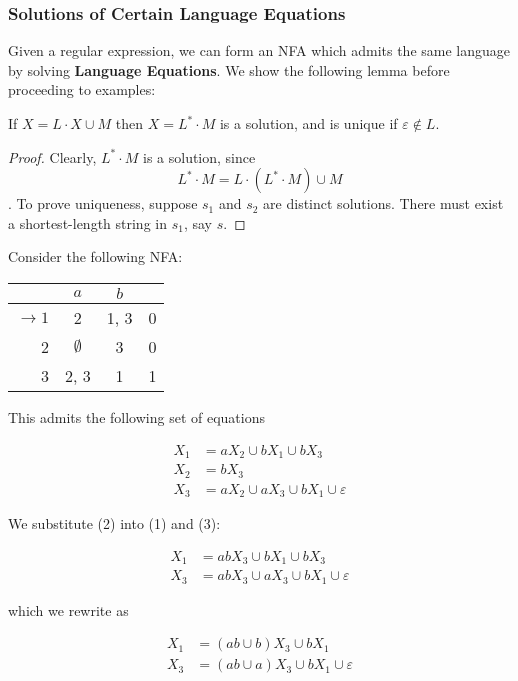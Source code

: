 \subsubsection{Solutions of Certain Language Equations}\label{subsubsec:solutions-of-certain-language-equations}

Given a regular expression, we can form an NFA which admits the same language by solving \textbf{Language Equations}. We show the following lemma before proceeding to examples:

\begin{lemma}
      If $X=L\cdot X\cup M$ then $X=L^*\cdot M$ is a solution, and is unique if $\varepsilon\not\in L$. 
\end{lemma}

\begin{proof}
      Clearly, $L^*\cdot M$ is a solution, since \[L^*\cdot M = L\cdot (L^*\cdot M)\cup M\]. To prove uniqueness, suppose $s_1$ and $s_2$ are distinct solutions. There must exist a shortest-length string in $s_1$, say $s$. 
\end{proof}

Consider the following NFA:

\begin{center}\begin{tabular}{r| c c r}
      & $a$ & $b$ & \\\hline
      $\to 1$ & 2 & 1, 3 & 0\\
            2 & $\emptyset$ & 3 & 0\\
            3 & 2, 3 & 1 & 1
 \end{tabular}\end{center}

This admits the following set of equations 

\begin{align}
      X_1 &= aX_2\cup bX_1\cup bX_3\\
      X_2 &= bX_3\\
      X_3 &= aX_2\cup aX_3\cup bX_1\cup\varepsilon
\end{align}

We substitute (2) into (1) and (3):

\begin{align*}
      X_1 &= abX_3\cup bX_1\cup bX_3\\
      X_3 &= abX_3\cup aX_3\cup bX_1\cup\varepsilon
\end{align*}

which we rewrite as

\begin{align*}
      X_1 &= (ab\cup b)X_3\cup bX_1\\
      X_3 &= (ab\cup a)X_3\cup bX_1\cup\varepsilon
\end{align*}

